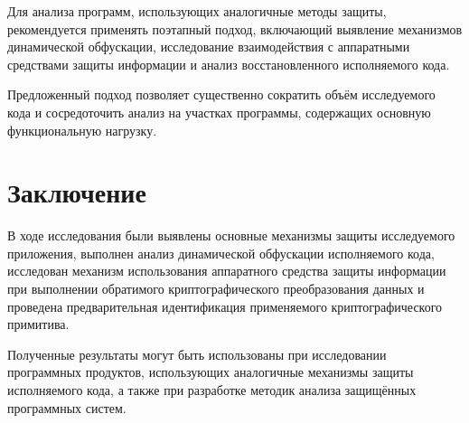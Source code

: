 \documentclass[a4paper,12pt]{article}
\newenvironment{abstractK}{}
\theoremstyle{definition}
\begin{document}
\begin{abstractK}
Для анализа программ, использующих аналогичные методы защиты, рекомендуется применять поэтапный подход, включающий выявление механизмов динамической обфускации, исследование взаимодействия с аппаратными средствами защиты информации и анализ восстановленного исполняемого кода.

Предложенный подход позволяет существенно сократить объём исследуемого кода и сосредоточить анализ на участках программы, содержащих основную функциональную нагрузку.

\section*{Заключение}

В ходе исследования были выявлены основные механизмы защиты исследуемого приложения, выполнен анализ динамической обфускации исполняемого кода, исследован механизм использования аппаратного средства защиты информации при выполнении обратимого криптографического преобразования данных и проведена предварительная идентификация применяемого криптографического примитива.

Полученные результаты могут быть использованы при исследовании программных продуктов, использующих аналогичные механизмы защиты исполняемого кода, а также при разработке методик анализа защищённых программных систем.
\end{document}
